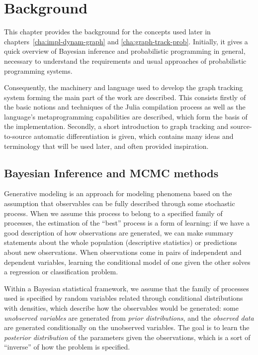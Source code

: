 \chapter{Background}
\label{cha:background}

This chapter provides the background for the concepts used later in
chapters~\ref{cha:impl-dynam-graph} and \ref{cha:graph-track-prob}.  Initially, it gives a quick
overview of Bayesian inference and probabilistic programming in general, necessary to understand the
requirements and usual approaches of probabilistic programming systems.

Consequently, the machinery and language used to develop the graph tracking system forming the main
part of the work are described.  This consists firstly of the basic notions and techniques of the
Julia compilation process as well as the language's metaprogramming capabilities are described,
which form the basis of the implementation.  Secondly, a short introduction to graph tracking and
source-to-source automatic differentiation is given, which contains many ideas and terminology that
will be used later, and often provided inspiration.


\section{Bayesian Inference and MCMC methods}
\label{sec:bayes-infer}

Generative modeling is an approach for modeling phenomena based on the assumption that
observables can be fully described through some stochastic process.  When we assume this process to
belong to a specified family of processes, the estimation of the \enquote{best} process is a form of
learning: if we have a good description of how observations are generated, we can make summary
statements about the whole population (descriptive statistics) or predictions about new
observations.  When observations come in pairs of independent and dependent variables, learning the
conditional model of one given the other solves a regression or classification problem.

Within a Bayesian statistical framework, we assume that the family of processes used is specified by
random variables related through conditional distributions with densities, which describe how the
observables would be generated: some \emph{unobserved variables} are generated from \emph{prior
  distributions}, and the \emph{observed data} are generated conditionally on the unobserved
variables.  The goal is to learn the \emph{posterior distribution} of the parameters given the
observations, which is a sort of \enquote{inverse} of how the problem is specified.

